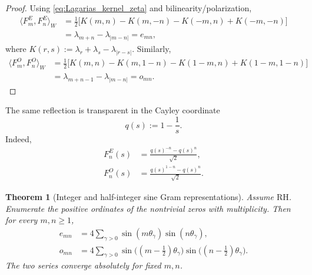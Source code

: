 \documentclass[11pt]{amsart}
\numberwithin{equation}{section}
\theoremstyle{plain}
\newtheorem{theorem}{Theorem}[section]
\theoremstyle{definition}
\theoremstyle{remark}
\newcommand{\RH}{\mathrm{RH}}
\begin{document}
\begin{proof}
Using \eqref{eq:Lagarias_kernel_zeta} and bilinearity/polarization,
\begin{align}
\langle F_m^E,F_n^E\rangle_W
&=\frac12\bigl[
K(m,n)-K(m,-n)-K(-m,n)+K(-m,-n)
\bigr]
\label{eq:E_exact_polarization}\\
&=\lambda_{m+n}-\lambda_{|m-n|}=e_{mn},
\label{eq:E_exact_polarization_result}
\end{align}
where $K(r,s):=\lambda_r+\lambda_s-\lambda_{|r-s|}$. Similarly,
\begin{align}
\langle F_m^O,F_n^O\rangle_W
&=\frac12\bigl[
K(m,n)-K(m,1-n)-K(1-m,n)+K(1-m,1-n)
\bigr]
\label{eq:O_exact_polarization}\\
&=\lambda_{m+n-1}-\lambda_{|m-n|}=o_{mn}.
\label{eq:O_exact_polarization_result}
\end{align}
\end{proof}

The same reflection is transparent in the Cayley coordinate
\begin{equation}
q(s):=1-\frac1s.
\label{eq:q_coordinate}
\end{equation}
Indeed,
\begin{align}
F_n^E(s)
&=\frac{q(s)^{-n}-q(s)^n}{\sqrt2},
\label{eq:FE_q_form}\\
F_n^O(s)
&=\frac{q(s)^{1-n}-q(s)^n}{\sqrt2}.
\label{eq:FO_q_form}
\end{align}

\begin{theorem}[Integer and half-integer sine Gram representations]
\label{thm:gram_representations}
Assume $\RH$. Enumerate the positive ordinates of the nontrivial zeros with multiplicity. Then for every $m,n\ge1$,
\begin{align}
e_{mn}
&=4\sum_{\gamma>0}
\sin(m\theta_\gamma)\sin(n\theta_\gamma),
\label{eq:E_gram}\\
o_{mn}
&=4\sum_{\gamma>0}
\sin\bigl((m-\tfrac12)\theta_\gamma\bigr)
\sin\bigl((n-\tfrac12)\theta_\gamma\bigr).
\label{eq:O_gram}
\end{align}
The two series converge absolutely for fixed $m,n$.
\end{theorem}
\end{document}
